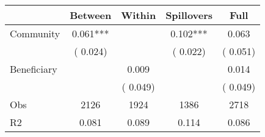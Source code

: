 
\begin{tabular}{l*{4}{c}}\hline&\multicolumn{1}{c}{Between}&\multicolumn{1}{c}{Within}&\multicolumn{1}{c}{Spillovers}&\multicolumn{1}{c}{Full}\\ \hline
 Community             &              0.061***      &                                               &        0.102*** &         0.063                            \\ 
                               &        (       0.024)           &                                       &       (       0.022)     &      (       0.051)                                           \\ 
 Beneficiary   &                                               &        0.009    &                                &             0.014                            \\ 
                               &                                               & (       0.049)                  &                                        &      (       0.049)                                           \\ 
\hline                                                                                                                                                                                                                                            
 Obs                   &               2126               &       1924                       &       1386                &              2718                                               \\ 
 R2                    &                      0.081              &              0.089                      &              0.114               &                     0.086                                              \\ 
\hline \end{tabular}                                                                                                                                                                                                              